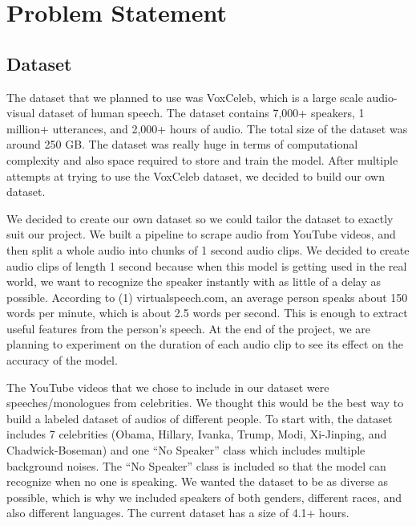 \documentclass[10pt,twocolumn,letterpaper]{article}
\begin{document}

\section{Problem Statement}

\subsection{Dataset}

The dataset that we planned to use was VoxCeleb, which is a  large scale audio-visual dataset of human speech. The dataset contains 7,000+ speakers, 1 million+ utterances, and 2,000+ hours of audio. The total size of the dataset was around 250 GB. The dataset was really huge in terms of computational complexity and also space required to store and train the model. After multiple attempts at trying to use the VoxCeleb dataset, we decided to build our own dataset. 

We decided to create our own dataset so we could tailor the dataset to exactly suit our project. We built a pipeline to scrape audio from YouTube videos, and then split a whole audio into chunks of 1 second audio clips. We decided to create audio clips of length 1 second because when this model is getting used in the real world, we want to recognize the speaker instantly with as little of a delay as possible. According to (1) virtualspeech.com, an average person speaks about 150 words per minute, which is about 2.5 words per second. This is enough to extract useful features from the person’s speech. At the end of the project, we are planning to experiment on the duration of each audio clip to see its effect on the accuracy of the model. 

The YouTube videos that we chose to include in our dataset were speeches/monologues from celebrities. We thought this would be the best way to build a labeled dataset of audios of different people. To start with, the dataset includes 7  celebrities (Obama, Hillary, Ivanka, Trump, Modi, Xi-Jinping, and Chadwick-Boseman) and one “No Speaker” class which includes multiple background noises. The “No Speaker” class is included so that the model can recognize when no one is speaking.  We wanted the dataset to be as diverse as possible, which is why we included speakers of both genders, different races, and also different languages. The current dataset has a size of 4.1+ hours.  
\end{document}
